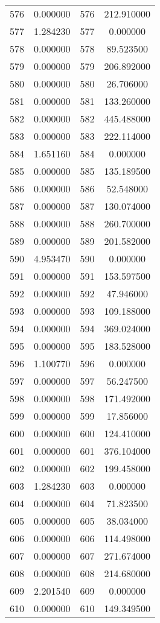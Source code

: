 \documentclass[12pt]{article}
\begin{document}
\begin{longtable}{@{}cccc@{}}
576 & 0.000000 & 576 & 212.910000 \\
577 & 1.284230 & 577 & 0.000000 \\
578 & 0.000000 & 578 & 89.523500 \\
579 & 0.000000 & 579 & 206.892000 \\
580 & 0.000000 & 580 & 26.706000 \\
581 & 0.000000 & 581 & 133.260000 \\
582 & 0.000000 & 582 & 445.488000 \\
583 & 0.000000 & 583 & 222.114000 \\
584 & 1.651160 & 584 & 0.000000 \\
585 & 0.000000 & 585 & 135.189500 \\
586 & 0.000000 & 586 & 52.548000 \\
587 & 0.000000 & 587 & 130.074000 \\
588 & 0.000000 & 588 & 260.700000 \\
589 & 0.000000 & 589 & 201.582000 \\
590 & 4.953470 & 590 & 0.000000 \\
591 & 0.000000 & 591 & 153.597500 \\
592 & 0.000000 & 592 & 47.946000 \\
593 & 0.000000 & 593 & 109.188000 \\
594 & 0.000000 & 594 & 369.024000 \\
595 & 0.000000 & 595 & 183.528000 \\
596 & 1.100770 & 596 & 0.000000 \\
597 & 0.000000 & 597 & 56.247500 \\
598 & 0.000000 & 598 & 171.492000 \\
599 & 0.000000 & 599 & 17.856000 \\
600 & 0.000000 & 600 & 124.410000 \\
601 & 0.000000 & 601 & 376.104000 \\
602 & 0.000000 & 602 & 199.458000 \\
603 & 1.284230 & 603 & 0.000000 \\
604 & 0.000000 & 604 & 71.823500 \\
605 & 0.000000 & 605 & 38.034000 \\
606 & 0.000000 & 606 & 114.498000 \\
607 & 0.000000 & 607 & 271.674000 \\
608 & 0.000000 & 608 & 214.680000 \\
609 & 2.201540 & 609 & 0.000000 \\
610 & 0.000000 & 610 & 149.349500 \\

\end{longtable}
\end{document}
